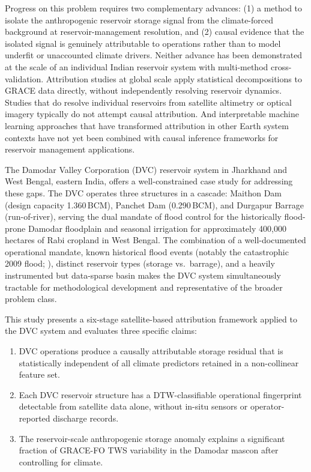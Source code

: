 \documentclass[preprint,12pt,authoryear]{elsarticle}
\begin{document}
Progress on this problem requires two complementary advances: (1) a method to
isolate the anthropogenic reservoir storage signal from the climate-forced
background at reservoir-management resolution, and (2) causal evidence that
the isolated signal is genuinely attributable to operations rather than to
model underfit or unaccounted climate drivers. Neither advance has been
demonstrated at the scale of an individual Indian reservoir system with
multi-method cross-validation. Attribution studies at global scale
\citep{Ji2023,Wada2017} apply statistical decompositions to GRACE data
directly, without independently resolving reservoir dynamics. Studies that do
resolve individual reservoirs from satellite altimetry or optical imagery
\citep{Besseling2021} typically do not attempt causal attribution. And
interpretable machine learning approaches that have transformed attribution
in other Earth system contexts \citep{Lundberg2017} have not yet been combined
with causal inference frameworks for reservoir management applications.

The Damodar Valley Corporation (DVC) reservoir system in Jharkhand and West
Bengal, eastern India, offers a well-constrained case study for addressing
these gaps. The DVC operates three structures in a cascade: Maithon Dam
(design capacity 1.360\,BCM), Panchet Dam (0.290\,BCM), and Durgapur Barrage
(run-of-river), serving the dual mandate of flood control for the
historically flood-prone Damodar floodplain and seasonal irrigation for
approximately 400,000 hectares of Rabi cropland in West Bengal. The
combination of a well-documented operational mandate, known historical flood
events (notably the catastrophic 2009 flood; \citealt{Maiti2011}), distinct
reservoir types (storage vs.\ barrage), and a heavily instrumented but
data-sparse basin makes the DVC system simultaneously tractable for
methodological development and representative of the broader problem class.

This study presents a six-stage satellite-based attribution framework
applied to the DVC system and evaluates three specific claims:
\begin{enumerate}
  \item[\textbf{C1.}] DVC operations produce a causally attributable storage
    residual that is statistically independent of all climate predictors
    retained in a non-collinear feature set.
  \item[\textbf{C2.}] Each DVC reservoir structure has a DTW-classifiable
    operational fingerprint detectable from satellite data alone, without
    in-situ sensors or operator-reported discharge records.
  \item[\textbf{C3.}] The reservoir-scale anthropogenic storage anomaly
    explains a significant fraction of GRACE-FO TWS variability in the
    Damodar mascon after controlling for climate.
\end{enumerate}
\end{document}
